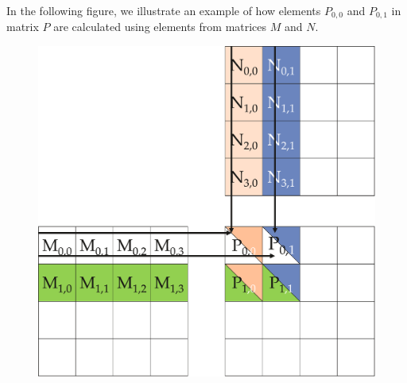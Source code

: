 \highspace
In the following figure, we illustrate an example of how elements $P_{0,0}$ and $P_{0,1}$ in matrix $P$ are calculated using elements from matrices $M$ and $N$.
\begin{figure}[!htp]
    \centering
    \includegraphics[width=.6\textwidth]{img/cuda-matrix-multiplication-3.pdf}
\end{figure}

